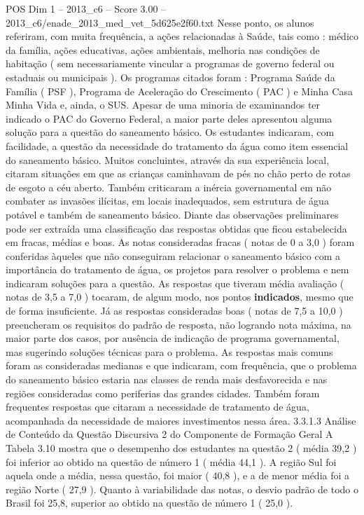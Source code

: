 \begin{textsample}{POS Dim 1 – 2013\_c6 – Score 3.00 – 2013\_c6/enade\_2013\_med\_vet\_5d625e2f60.txt}
Nesse ponto, os alunos referiram, com muita frequência, a ações relacionadas à Saúde, tais como : médico da família, ações educativas, ações ambientais, melhoria nas condições de habitação ( sem necessariamente vincular a programas de governo federal ou estaduais ou municipais ).
Os programas citados foram : Programa Saúde da Família ( PSF ), Programa de Aceleração do Crescimento ( PAC ) e Minha Casa Minha Vida e, ainda, o SUS.
Apesar de uma minoria de examinandos ter indicado o PAC do Governo Federal, a maior parte deles apresentou alguma solução para a questão do saneamento básico.
Os estudantes indicaram, com facilidade, a questão da necessidade do tratamento da água como item essencial do saneamento básico.
Muitos concluintes, através da sua experiência local, citaram situações em que as crianças caminhavam de pés no chão perto de rotas de esgoto a céu aberto.
Também criticaram a inércia governamental em não combater as invasões ilícitas, em locais inadequados, sem estrutura de água potável e também de saneamento básico.
Diante das observações preliminares pode ser extraída uma classificação das respostas obtidas que ficou estabelecida em fracas, médias e boas.
As notas consideradas fracas ( notas de 0 a 3,0 ) foram conferidas àqueles que não conseguiram relacionar o saneamento básico com a importância do tratamento de água, os projetos para resolver o problema e nem indicaram soluções para a questão.
As respostas que tiveram média avaliação ( notas de 3,5 a 7,0 ) tocaram, de algum modo, nos pontos \textbf{indicados}, mesmo que de forma insuficiente.
Já as respostas consideradas boas ( notas de 7,5 a 10,0 ) preencheram os requisitos do padrão de resposta, não logrando nota máxima, na maior parte dos casos, por ausência de indicação de programa governamental, mas sugerindo soluções técnicas para o problema.
As respostas mais comuns foram as consideradas medianas e que indicaram, com frequência, que o problema do saneamento básico estaria nas classes de renda mais desfavorecida e nas regiões consideradas como periferias das grandes cidades.
Também foram frequentes respostas que citaram a necessidade de tratamento de água, acompanhada da necessidade de maiores investimentos nessa área. 3.3.1.3 Análise de Conteúdo da Questão Discursiva 2 do Componente de Formação Geral A Tabela 3.10 mostra que o desempenho dos estudantes na questão 2 ( média 39,2 ) foi inferior ao obtido na questão de número 1 ( média 44,1 ).
A região Sul foi aquela onde a média, nessa questão, foi maior ( 40,8 ), e a de menor média foi a região Norte ( 27,9 ).
Quanto à variabilidade das notas, o desvio padrão de todo o Brasil foi 25,8, superior ao obtido na questão de número 1 ( 25,0 ).

\end{textsample}
